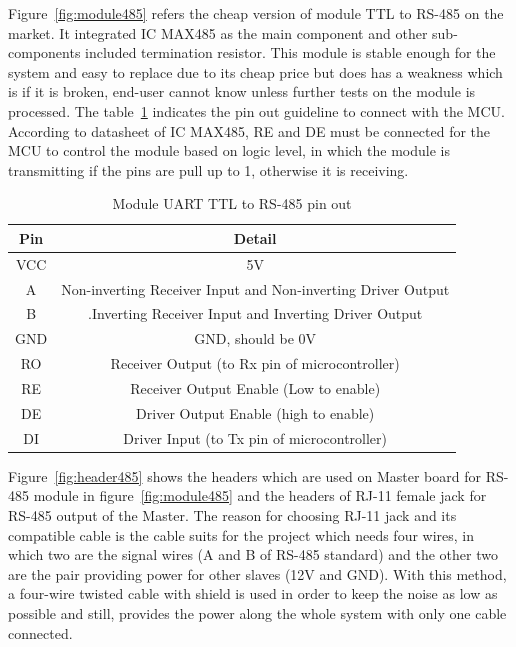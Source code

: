       Figure~\ref{fig:module485} refers the cheap version of module TTL to RS-485 on the market. It integrated IC MAX485 as the main component and other sub-components included termination resistor. This module is stable enough for the system and easy to replace due to its cheap price but does has a weakness which is if it is broken, end-user cannot know unless further tests on the module is processed. The table~\ref{table:module485PinOut} indicates the pin out guideline to connect with the MCU. According to datasheet of IC MAX485, RE and DE must be connected for the MCU to control the module based on logic level, in which the module is transmitting if the pins are pull up to 1, otherwise it is receiving.
      \begin{table}[h!]
        \begin{center}
        \begin{tabular}{ |c||c|  }
          \hline
          Pin & Detail\\
          \hline
          VCC& 5V\\
          \hline
          A&   Non-inverting Receiver Input and Non-inverting Driver Output\\
          \hline
          B &.Inverting Receiver Input and Inverting Driver Output\\
          \hline
          GND & GND, should be 0V\\
          \hline
          RO & Receiver Output (to Rx pin of microcontroller)\\
          \hline
          RE & Receiver Output Enable (Low to enable)\\
          \hline
          DE & Driver Output Enable (high to enable)\\
          \hline
          DI & Driver Input (to Tx pin of microcontroller)\\
          \hline
         \end{tabular}
         \caption{Module UART TTL to RS-485 pin out}
         \label{table:module485PinOut}
        \end{center}
        \end{table}
      
      Figure~\ref{fig:header485} shows the headers which are used on Master board for RS-485 module in figure~\ref{fig:module485} and the headers of RJ-11 female jack for RS-485 output of the Master. The reason for choosing RJ-11 jack and its compatible cable is the cable suits for the project which needs four wires, in which two are the signal wires (A and B of RS-485 standard) and the other two are the pair providing power for other slaves (12V and GND). With this method, a four-wire twisted cable with shield is used in order to keep the noise as low as possible and still, provides the power along the whole system with only one cable connected.

